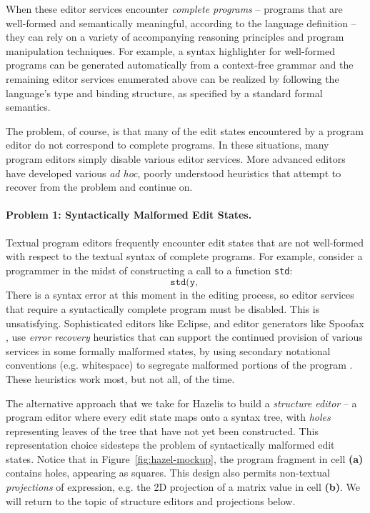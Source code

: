 \documentclass[letterpaper,USenglish]{lipics-v2016}
\newcommand{\Hazel}[0]{\textsf{Hazel}}
\newcommand{\HazelEnv}[0]{\Hazel}
\begin{document}
When these editor services encounter \emph{complete programs} -- programs that are well-formed and semantically meaningful, according to the language definition -- they can rely on a variety of accompanying reasoning principles and program manipulation techniques. For example, a syntax highlighter for well-formed programs can be generated automatically 
from a context-free grammar \cite{DBLP:conf/tools/KrahnRV08,DBLP:conf/cc/BrandDHJJKKMOSVVV01} and the remaining editor services enumerated above can be realized 
by following the language's type and binding structure, as specified by a standard formal
semantics.

The problem, of course, is that many of the {edit states} encountered by a program editor do not correspond to complete programs. In these situations, many program editors simply disable various editor services. More advanced editors have developed various \emph{ad hoc}, poorly understood heuristics that attempt to recover from the problem and continue on.

\paragraph{Problem 1: Syntactically Malformed Edit States.} 
Textual program editors frequently encounter edit states
that are not well-formed with respect to the textual syntax of complete
programs. For example, consider a programmer in the midst of
constructing a call to a function \lstinline{std}: 
\[
\texttt{std(y, }
\]
There is a syntax
error at this moment in the editing process, so editor services that require a syntactically
complete program must be disabled. This is unsatisfying. Sophisticated editors like Eclipse, and editor generators like Spoofax \cite{DBLP:conf/oopsla/KatsV10}, use \emph{error recovery} heuristics that can support the continued provision 
of various services in some formally malformed states, by using secondary notational conventions (e.g. whitespace) to segregate malformed portions of the program  \cite{DBLP:conf/oopsla/KatsJNV09,DBLP:conf/sle/JongeNKV09}. These heuristics work most, but not all, of the time.

The alternative approach that we take for \HazelEnv is to build a
\emph{structure editor} -- a program editor where every edit state
maps onto a syntax tree, with \emph{holes} representing leaves of the tree
that have not yet been constructed.  This representation choice sidesteps the
problem of syntactically malformed edit states. Notice that in
Figure~\ref{fig:hazel-mockup}, the program fragment in cell
\textbf{(a)} contains holes, appearing as squares. This design also permits
non-textual \emph{projections} of expression, e.g. 
the 2D projection of a matrix value in cell \textbf{(b)}.
We will return to the topic of structure editors and projections below.
\end{document}
